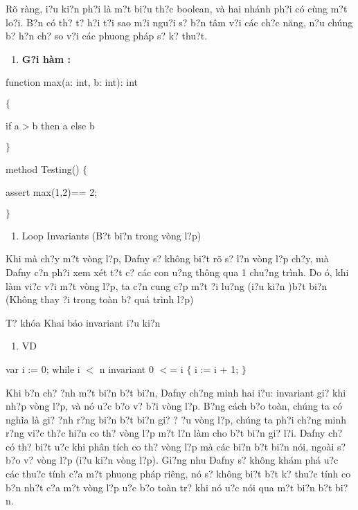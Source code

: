 \documentclass{article} %
\begin{document}
R\~{o} r\`{a}ng, {\dj}i?u ki?n ph?i l\`{a} m?t bi?u th?c boolean, v\`{a} hai nh\'{a}nh ph?i c\'{o} c\`{u}ng m?t lo?i. B?n c\'{o} th? t? h?i t?i sao m?i ngu?i s? b?n t\^{a}m v?i c\'{a}c ch?c n\u{a}ng, n?u ch\'{u}ng b? h?n ch? so v?i c\'{a}c phuong ph\'{a}p s? k? thu?t. 

\begin{enumerate}
\item  \textbf{G?i h\`{a}m :}
\end{enumerate}

\noindent  function max(a: int, b: int): int 

\noindent $\{$

\noindent    if a$>$b then a else b

\noindent $\}$

\noindent method Testing() $\{$

\noindent assert max(1,2)== 2;

\noindent $\}$

\begin{enumerate}
\item  Loop Invariants (B?t bi?n trong v\`{o}ng l?p)
\end{enumerate}

Khi m\`{a} ch?y m?t v\`{o}ng l?p, Dafny s? kh\^{o}ng bi?t r\~{o} s? l?n v\`{o}ng l?p ch?y, m\`{a} Dafny c?n ph?i xem x\'{e}t t?t c? c\'{a}c con {\dj}u?ng th\^{o}ng qua 1 chu?ng tr\`{i}nh. Do {\dj}\'{o}, khi l\`{a}m vi?c v?i  m?t v\`{o}ng l?p, ta c?n cung c?p m?t {\dj}?i lu?ng ({\dj}i?u ki?n )b?t bi?n (Kh\^{o}ng thay {\dj}?i trong to\`{a}n b? qu\'{a} tr\`{i}nh l?p)

T? kh\'{o}a Khai b\'{a}o invariant {\dj}i?u ki?n











\begin{enumerate}
\item  VD  
\end{enumerate}

\noindent var i := 0;   while i $<$ n      invariant 0 $<$= i    $\{$      i := i + 1;   $\}$

Khi b?n ch? {\dj}?nh m?t bi?n b?t bi?n, Dafny ch?ng minh hai {\dj}i?u: invariant gi? khi nh?p v\`{o}ng l?p, v\`{a} n\'{o} {\dj}u?c b?o v? b?i v\`{o}ng l?p. B?ng c\'{a}ch b?o to\`{a}n, ch\'{u}ng ta c\'{o} ngh\~{i}a l\`{a} gi? {\dj}?nh r?ng bi?n b?t bi?n gi? ? {\dj}?u v\`{o}ng l?p, ch\'{u}ng ta ph?i ch?ng minh r?ng vi?c th?c hi?n co th? v\`{o}ng l?p m?t l?n l\`{a}m cho b?t bi?n gi? l?i. Dafny ch? c\'{o} th? bi?t {\dj}u?c khi ph\^{a}n t\'{i}ch co th? v\`{o}ng l?p m\`{a} c\'{a}c bi?n b?t bi?n n\'{o}i, ngo\`{a}i s? b?o v? v\`{o}ng l?p ({\dj}i?u ki?n v\`{o}ng l?p). Gi?ng nhu Dafny s? kh\^{o}ng kh\'{a}m ph\'{a} {\dj}u?c c\'{a}c thu?c t\'{i}nh c?a m?t phuong ph\'{a}p ri\^{e}ng, n\'{o} s? kh\^{o}ng bi?t b?t k? thu?c t\'{i}nh co b?n nh?t c?a m?t v\`{o}ng l?p {\dj}u?c b?o to\`{a}n tr? khi n\'{o} {\dj}u?c n\'{o}i qua m?t bi?n b?t bi?n.
\end{document}
